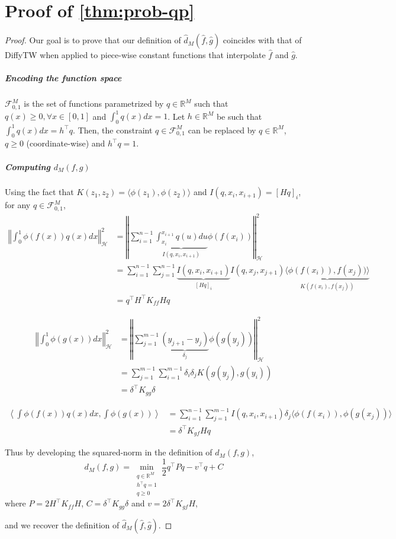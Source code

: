 \section{Proof of \cref{thm:prob-qp}}\label{proof:prob-qp}
\begin{proof}
Our goal is to prove that our definition of $\hat d_M(\hat f, \hat g)$ coincides with that of DiffyTW when applied to piece-wise constant functions that interpolate $\hat f$ and $\hat g$.

\subparagraph{Encoding the function space} $\mathcal F_{0, 1}^M$ is the set of functions parametrized by $q\in\mathbb R^M$ such that $q(x) \geq 0, \forall x\in [0,1]$ and $\int_0^1 q(x)dx= 1$. Let $h\in\mathbb R^M$ be such that $\int_0^1q(x)dx = h^\top q$. Then, the constraint $q\in\mathcal F_{0,1}^M$ can be replaced by $q\in\mathbb R^M$, $q\geq 0$ (coordinate-wise) and $h^\top q = 1$.


\subparagraph{Computing $d_M(f, g)$} Using the fact that $K(z_1, z_2) = \langle \phi(z_1), \phi(z_2)\rangle$ and $I(q, x_i, x_{i+1}) = [Hq]_i$, for any $q\in\mathcal F_{0,1}^M$,
\begin{align}
\left \Vert \int_0^1 \phi(f(x))q(x)dx \right\Vert^2_\mathcal H&=\left\Vert\sum_{i=1}^{n-1} \underbrace{\int_{x_i}^{x_{i+1}}q(u)du}_{I(q, x_i, x_{i+1})}\phi(f(x_i))\right\Vert_\mathcal H^2\\
&=\sum_{i=1}^{n-1}\sum_{j=1}^{n-1}\underbrace{I(q, x_i, x_{i+1})}_{[Hq]_i}I(q, x_j, x_{j+1})\underbrace{\langle \phi(f(x_i)), f(x_j))\rangle}_{K(f(x_i), f(x_j))}\\
&= q^\top H^\top K_{ff} H q
\end{align}

\begin{align}
\left\Vert\int_0^1\phi(g(x))dx\right\Vert_\mathcal H^2 &= \left\Vert\sum_{j=1}^{m-1} \underbrace{(y_{j+1} - y_j)}_{\delta_j}\phi(g(y_j))\right\Vert_\mathcal H^2\\
&= \sum_{j=1}^{m-1} \sum_{i=1}^{m-1} \delta_i \delta_j K(g(y_j), g(y_i))\\
& = \delta^\top K_{gg} \delta
\end{align}

\begin{align}
\left\langle \int\phi(f(x))q(x)dx, \int\phi(g(x))\right\rangle&=\sum_{i=1}^{n-1}\sum_{j=1}^{m-1} I(q, x_i, x_{i+1}) \delta_j \langle \phi(f(x_i)), \phi(g(x_j))\rangle\\
&= \delta^\top K_{gf} Hq
\end{align}

Thus by developing the squared-norm in the definition of $d_M(f, g)$,
\begin{equation}
d_M(f, g) = \min_{\substack{q\in\mathbb R^M \\ h^\top q = 1 \\ q \geq 0}} \frac{1}{2} q^\top P q - v^\top q + C
\end{equation}
where $P = 2 H^\top K_{ff}H$, $C = \delta^\top K_{gg}\delta$ and $v = 2\delta^\top K_{gf}H$,

and we recover the definition of $\hat d_M(\hat f, \hat g)$.
\end{proof}
